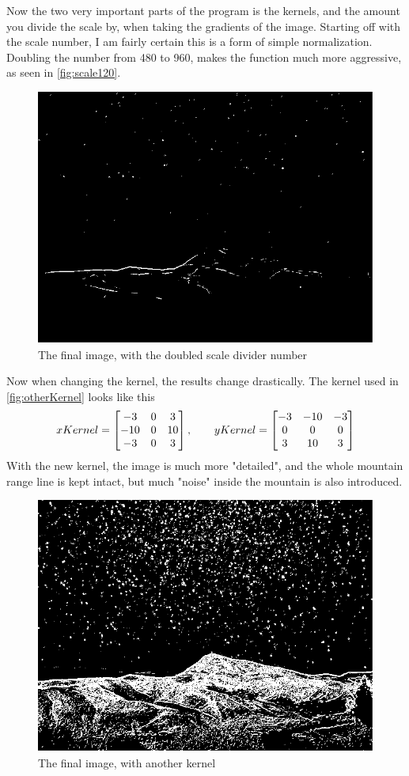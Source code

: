 Now the two very important parts of the program is the kernels, and the amount you divide the scale by, when taking the gradients of the image.
Starting off with the scale number, I am fairly certain this is a form of simple normalization. Doubling the number from 480 to 960, makes the function much more aggressive, as seen in \autoref{fig:scale120}.
\begin{figure}[H]
	\centering
	\includegraphics[width=0.6\linewidth]{figure/scale120}
	\caption{The final image, with the doubled scale divider number}
	\label{fig:scale120}
\end{figure}\newpage
Now when changing the kernel, the results change drastically. The kernel used in \autoref{fig:otherKernel} looks like this
\[
xKernel = 
\begin{bmatrix}
-3 & 0 & 3\\
-10 & 0 & 10\\
-3 & 0 & 3
\end{bmatrix},\hspace{0.7cm}
yKernel = 
\begin{bmatrix}
-3 & -10 & -3\\
0 & 0 & 0\\
3 & 10 & 3
\end{bmatrix}
\]
With the new kernel, the image is much more "detailed", and the whole mountain range line is kept intact, but much "noise" inside the mountain is also introduced.
\begin{figure}[H]
	\centering
	\includegraphics[width=0.7\linewidth]{figure/otherKernel}
	\caption{The final image, with another kernel}
	\label{fig:otherKernel}
\end{figure}